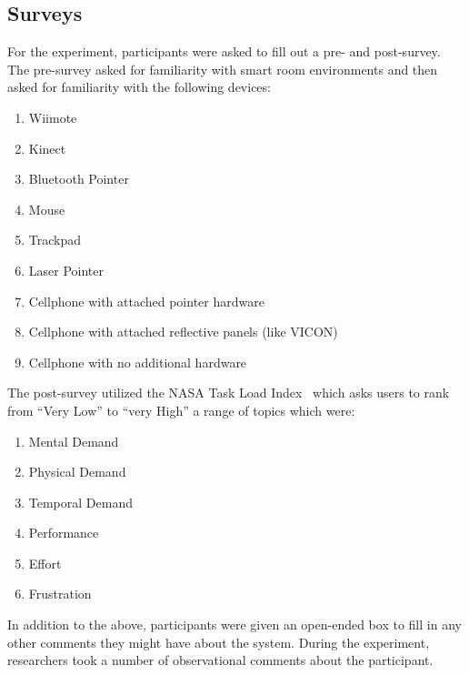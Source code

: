 \subsection{Surveys}

For the experiment, participants were asked to fill out a pre- and
post-survey. The pre-survey asked for familiarity with smart
room environments and then asked for familiarity with the
following devices:

\begin{enumerate}
    \item Wiimote
    \item Kinect
    \item Bluetooth Pointer
    \item Mouse
    \item Trackpad
    \item Laser Pointer
    \item Cellphone with attached pointer hardware
    \item Cellphone with attached reflective panels (like VICON)
    \item Cellphone with no additional hardware
\end{enumerate}

The post-survey utilized the NASA Task Load 
Index~\cite{hart_development_1988} which asks users to rank
from ``Very Low'' to ``very High'' a range of topics which were:

\begin{enumerate}
    \item Mental Demand
    \item Physical Demand
    \item Temporal Demand
    \item Performance
    \item Effort
    \item Frustration
\end{enumerate}

In addition to the above, participants were given an open-ended
box to fill in any other comments they might have about the system.
During the experiment, researchers took a number of observational
comments about the participant.